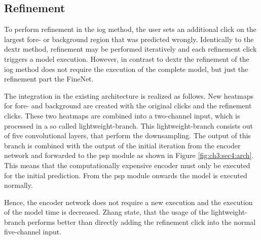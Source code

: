 \subsection{Refinement}\label{ord:ch3:sec4:subsec4}

To perform refinement in the \gls{iog} method, the user sets an additional click on the largest fore- or background region that was predicted wrongly.
Identically to the \gls{dextr} method, refinement may be performed iteratively and each refinement click triggers a model execution.
However, in contrast to \gls{dextr} the refinement of the \gls{iog} method does not require the execution of the complete model, but just the refinement part the FineNet.

The integration in the existing architecture is realized as follows.
New heatmaps for fore- and background are created with the original clicks and the refinement clicks.
These two heatmaps are combined into a two-channel input, which is processed in a so called lightweight-branch.
This lightweight-branch consists out of five convolutional layers, that perform the downsampling.
The output of this branch is combined with the output of the initial iteration from the encoder network and forwarded to the \gls{psp} module as shown in Figure \ref{fig:ch3:sec4:arch}.
This means that the computationally expensive encoder must only be executed for the initial prediction.
From the \gls{psp} module onwards the model is executed normally.

Hence, the encoder network does not require a new execution and the execution of the model time is decreased.
Zhang \etal state, that the usage of the lightweight-branch performs better than directly adding the refinement click into the normal five-channel input.

